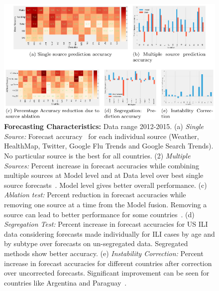 \documentclass[10pt,letterpaper]{article}
\begin{document}
\begin{figure}[t]
  \centering
  \includegraphics[width=0.96\linewidth]{./figs/Fig2.eps}

  \caption{\textbf{Forecasting Characteristics:} Data range 2012-2015.
  (a) \textit{Single Source:}
  Forecast accuracy~\cite{tabataba2015smq} for each individual source (Weather, HealthMap, 
  Twitter, Google Flu Trends and Google Search Trends). No particular 
  source is the best for all countries.
  (2) \textit{Multiple Sources:}
  Percent increase in forecast accuracies while combining multiple sources at 
  Model level and at Data level over best single source forecasts~\cite{chakraborty2014forecasting}.
  Model level gives better overall performance.
  (c) \textit{Ablation test:}
  Percent reduction in forecast accuracies while 
  removing one source at a time from the Model fusion. 
  Removing a source can lead to better performance for some
  countries~\cite{chakraborty2014forecasting}.
  (d) \textit{Segregation Test:}
  Percent increase in forecast accuracies for US ILI data considering forecasts made individually 
  for ILI cases by age and by subtype  over forecasts on un-segregated data.
  Segregated methods show better accuracy.
  (e) \textit{Instability Correction:}
  Percent increase in forecast accuracies for different countries after
  correction over uncorrected forecasts.  Significant improvement can be seen
  for countries like Argentina and Paraguay~\cite{chakraborty2014forecasting}.
  \label{fig2}
  }
\end{figure}
\end{document}
